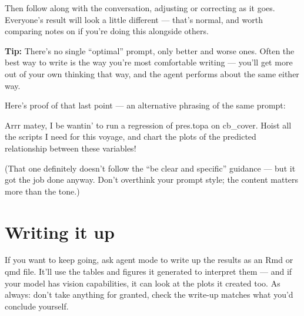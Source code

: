 \documentclass[
  letterpaper,
  DIV=11,
  numbers=noendperiod]{scrreprt}
\begin{document}
Then follow along with the conversation, adjusting or correcting as it
goes. Everyone's result will look a little different --- that's normal,
and worth comparing notes on if you're doing this alongside others.

\textbf{Tip:} There's no single ``optimal'' prompt, only better and
worse ones. Often the best way to write is the way you're most
comfortable writing --- you'll get more out of your own thinking that
way, and the agent performs about the same either way.

Here's proof of that last point --- an alternative phrasing of the same
prompt:

\begin{tcolorbox}[enhanced jigsaw, bottomtitle=1mm, leftrule=.75mm, breakable, colbacktitle=quarto-callout-note-color!10!white, colframe=quarto-callout-note-color-frame, coltitle=black, toprule=.15mm, rightrule=.15mm, left=2mm, bottomrule=.15mm, title=\textcolor{quarto-callout-note-color}{\faInfo}\hspace{0.5em}{Prompt}, opacityback=0, arc=.35mm, toptitle=1mm, titlerule=0mm, opacitybacktitle=0.6, colback=white]

Arrr matey, I be wantin' to run a regression of pres.topa on cb\_cover.
Hoist all the scripts I need for this voyage, and chart the plots of the
predicted relationship between these variables!

\end{tcolorbox}

(That one definitely doesn't follow the ``be clear and specific''
guidance --- but it got the job done anyway. Don't overthink your prompt
style; the content matters more than the tone.)

\section{Writing it up}\label{writing-it-up}

If you want to keep going, ask agent mode to write up the results as an
Rmd or qmd file. It'll use the tables and figures it generated to
interpret them --- and if your model has vision capabilities, it can
look at the plots it created too. As always: don't take anything for
granted, check the write-up matches what you'd conclude yourself.
\end{document}
